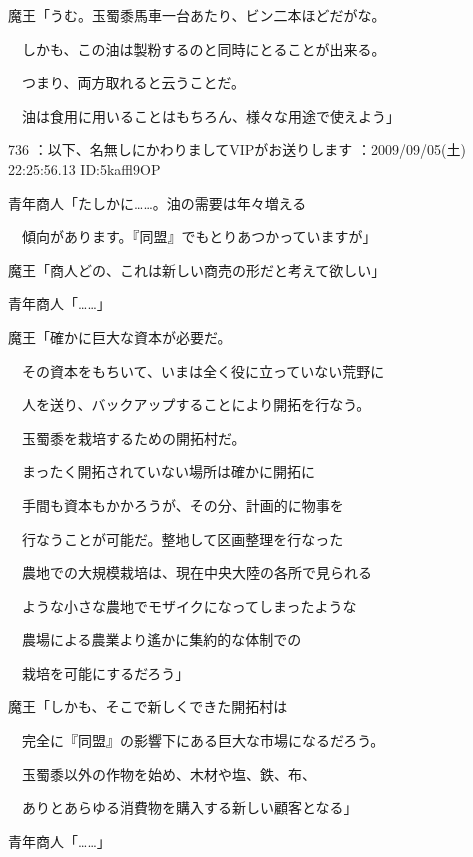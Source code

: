 \documentclass[a4j,twocolumn]{tarticle}
\begin{document}
魔王「うむ。玉蜀黍馬車一台あたり、ビン二本ほどだがな。\par{} 
　しかも、この油は製粉するのと同時にとることが出来る。\par{} 
　つまり、両方取れると云うことだ。\par{} 
　油は食用に用いることはもちろん、様々な用途で使えよう」 

	
    
    

736 ：以下、名無しにかわりましてVIPがお送りします ：2009/09/05(土) 22:25:56.13 ID:5kaffl9OP 


青年商人「たしかに……。油の需要は年々増える\par{} 
　傾向があります。『同盟』でもとりあつかっていますが」 



魔王「商人どの、これは新しい商売の形だと考えて欲しい」 



青年商人「……」 



魔王「確かに巨大な資本が必要だ。\par{} 
　その資本をもちいて、いまは全く役に立っていない荒野に\par{} 
　人を送り、バックアップすることにより開拓を行なう。\par{} 
　玉蜀黍を栽培するための開拓村だ。\par{} 
　まったく開拓されていない場所は確かに開拓に\par{} 
　手間も資本もかかろうが、その分、計画的に物事を\par{} 
　行なうことが可能だ。整地して区画整理を行なった\par{} 
　農地での大規模栽培は、現在中央大陸の各所で見られる\par{} 
　ような小さな農地でモザイクになってしまったような\par{} 
　農場による農業より遙かに集約的な体制での\par{} 
　栽培を可能にするだろう」 



魔王「しかも、そこで新しくできた開拓村は\par{} 
　完全に『同盟』の影響下にある巨大な市場になるだろう。\par{} 
　玉蜀黍以外の作物を始め、木材や塩、鉄、布、\par{} 
　ありとあらゆる消費物を購入する新しい顧客となる」 



青年商人「……」 
\end{document}

